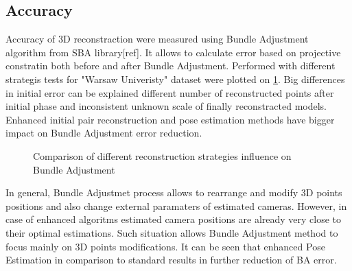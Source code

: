 \subsection{Accuracy}
Accuracy of 3D reconstraction were measured using Bundle Adjustment algorithm from SBA library[ref]. It allows to calculate error based on projective constratin both before and after Bundle Adjustment.
Performed with different strategis tests for "Warsaw Univeristy" dataset were plotted on \ref{plot:BAError}. Big differences in initial error can be explained different number of reconstructed points after initial phase and inconsistent unknown scale of finally reconstracted models. Enhanced initial pair reconstruction and pose estimation methods have bigger impact on Bundle Adjustment error reduction.
\begin{figure}[ht!]
  \begin{center}
    \caption{Comparison of different reconstruction strategies influence on Bundle Adjustment}
    \label{plot:BAError}
  \end{center}
\end{figure}
\clearpage
In general, Bundle Adjustmet process allows to rearrange and modify 3D points positions and also change external paramaters of estimated cameras. However, in case of enhanced algoritms estimated camera positions are already very close to their optimal estimations.  Such situation allows Bundle Adjustment method to focus mainly on 3D points modifications. It can be seen that enhanced Pose Estimation in comparison to standard results in further reduction of BA error. 

